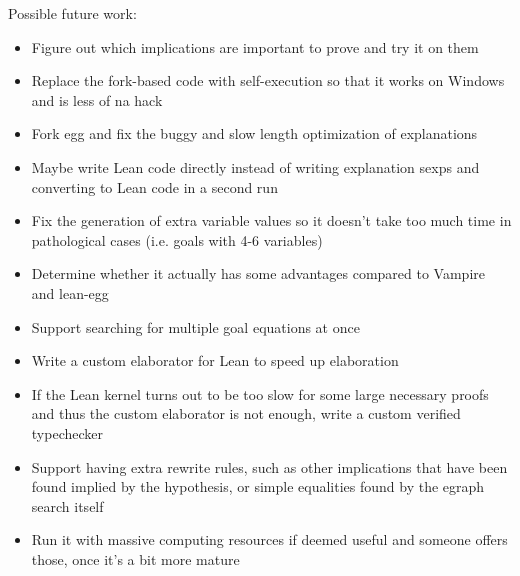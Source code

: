 Possible future work:

\begin{itemize}
	\item Figure out which implications are important to prove and try it on them
	\item Replace the fork-based code with self-execution so that it works on Windows and is less of na hack
	\item Fork egg and fix the buggy and slow length optimization of explanations
	\item Maybe write Lean code directly instead of writing explanation sexps and converting to Lean code in a second run
	\item Fix the generation of extra variable values so it doesn't take too much time in pathological cases (i.e. goals with 4-6 variables)
	\item Determine whether it actually has some advantages compared to Vampire and lean-egg
	\item Support searching for multiple goal equations at once
	\item Write a custom elaborator for Lean to speed up elaboration
	\item If the Lean kernel turns out to be too slow for some large necessary proofs and thus the custom elaborator is not enough, write a custom verified typechecker
	\item Support having extra rewrite rules, such as other implications that have been found implied by the hypothesis, or simple equalities found by the egraph search itself
	\item Run it with massive computing resources if deemed useful and someone offers those, once it's a bit more mature
\end{itemize}
